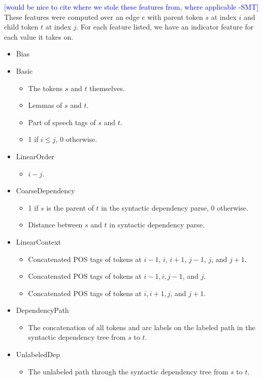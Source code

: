 \documentclass[11pt]{article}
\newcommand{\sam}[1]{\textcolor{blue}{[#1 -SMT]}}
\begin{document}
\label{s:features}

\sam{would be nice to cite where we stole these features from, where applicable}
These features were computed over an edge $e$ with parent token $s$ at index
$i$ and child token $t$ at index $j$. 
For each feature listed, we have an indicator feature for each value it takes
on.

\begin{itemize}
	\item Bias
	\item Basic
	\begin{itemize}
		\item The tokens $s$ and $t$ themselves.
		\item Lemmas of $s$ and $t$.
		\item Part of speech tags of $s$ and $t$.
		\item 1 if $i \le j$, 0 otherwise.
	\end{itemize}
	\item LinearOrder
		\begin{itemize}
		\item $i - j$.
	\end{itemize}
	\item CoarseDependency
		\begin{itemize}
		\item 1 if $s$ is the parent of $t$ in the syntactic dependency parse, 0
		otherwise.
		\item Distance between $s$ and $t$ in syntactic dependency parse.
	\end{itemize}
	\item LinearContext
		\begin{itemize}
		\item Concatenated POS tags of tokens at $i-1$, $i$, $i+1$, $j-1$, $j$,
		and $j+1$.
		\item Concatenated POS tags of tokens at $i-1, i, j-1$, and $j$.
		\item Concatenated POS tags of tokens at $i, i+1, j$, and $j+1$.
	\end{itemize}
	\item DependencyPath
		\begin{itemize}
		\item The concatenation of all tokens and arc labels on the labeled path in
		the syntactic dependency tree from $s$ to $t$.
	\end{itemize}
	\item UnlabeledDep
		\begin{itemize}
		\item The unlabeled path through the syntactic dependency tree from $s$ to $t$. 

\end{itemize}
\end{itemize}
\end{document}
